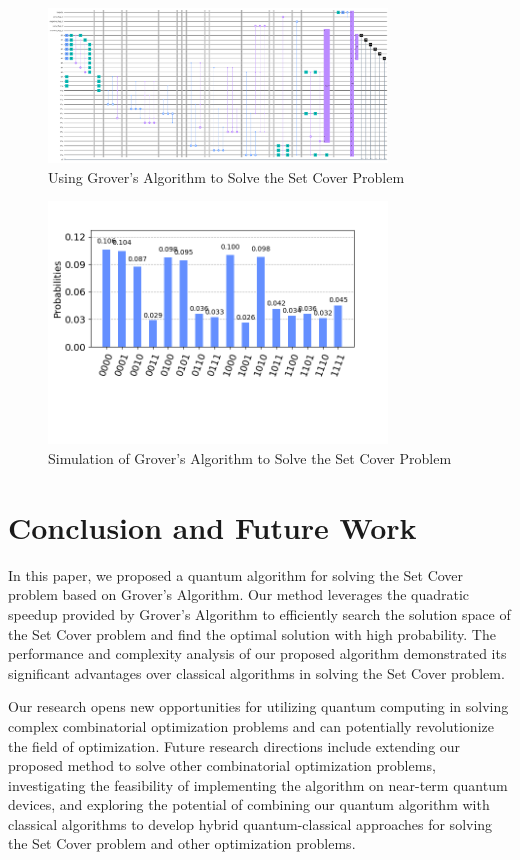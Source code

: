 \begin{figure}[htp]
    \centering
    \includegraphics[width=9cm]{Figures/Set_Cover_circuit.png}
    \caption{Using Grover's Algorithm to Solve the Set Cover Problem}
    \label{fig:Set_Cover}
\end{figure}


\begin{figure}[htp]
    \centering
    \includegraphics[width=9cm]{Figures/Set_Cover_hist.png}
    \caption{Simulation of Grover's Algorithm to Solve the Set Cover Problem}
    \label{hist:Set_Cover}
\end{figure}

\section{Conclusion and Future Work}
\label{sec:conclusion}

In this paper, we proposed a quantum algorithm for solving the Set Cover problem based on Grover's Algorithm. Our method leverages the quadratic speedup provided by Grover's Algorithm to efficiently search the solution space of the Set Cover problem and find the optimal solution with high probability. The performance and complexity analysis of our proposed algorithm demonstrated its significant advantages over classical algorithms in solving the Set Cover problem.

Our research opens new opportunities for utilizing quantum computing in solving complex combinatorial optimization problems and can potentially revolutionize the field of optimization. Future research directions include extending our proposed method to solve other combinatorial optimization problems, investigating the feasibility of implementing the algorithm on near-term quantum devices, and exploring the potential of combining our quantum algorithm with classical algorithms to develop hybrid quantum-classical approaches for solving the Set Cover problem and other optimization problems.

